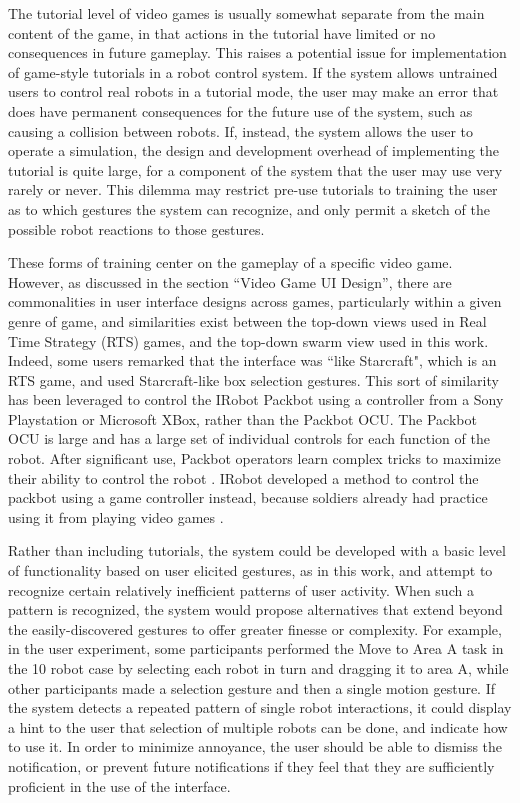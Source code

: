 The tutorial level of video games is usually somewhat separate from the main content of the game, in that actions in the tutorial have limited or no consequences in future gameplay. 
This raises a potential issue for implementation of game-style tutorials in a robot control system. 
If the system allows untrained users to control real robots in a tutorial mode, the user may make an error that does have permanent consequences for the future use of the system, such as causing a collision between robots. 
If, instead, the system allows the user to operate a simulation, the design and development overhead of implementing the tutorial is quite large, for a component of the system that the user may use very rarely or never. 
This dilemma may restrict pre-use tutorials to training the user as to which gestures the system can recognize, and only permit a sketch of the possible robot reactions to those gestures. 

These forms of training center on the gameplay of a specific video game. 
However, as discussed in the section ``Video Game UI Design'', there are commonalities in user interface designs across games, particularly within a given genre of game, and similarities exist between the top-down views used in Real Time Strategy (RTS) games, and the top-down swarm view used in this work. 
Indeed, some users remarked that the interface was ``like Starcraft", which is an RTS game, and used Starcraft-like box selection gestures. 
This sort of similarity has been leveraged to control the IRobot Packbot using a controller from a Sony Playstation or Microsoft XBox, rather than the Packbot OCU. 
The Packbot OCU is large and has a large set of individual controls for each function of the robot. 
After significant use, Packbot operators learn complex tricks to maximize their ability to control the robot \citep{micire2011design}.
IRobot developed a method to control the packbot using a game controller instead, because soldiers already had practice using it from playing video games \citep{glaser2010impact}. 

Rather than including tutorials, the system could be developed with a basic level of functionality based on user elicited gestures, as in this work, and attempt to recognize certain relatively inefficient patterns of user activity. 
When such a pattern is recognized, the system would propose alternatives that extend beyond the easily-discovered gestures to offer greater finesse or complexity. 
For example, in the user experiment, some participants performed the Move to Area A task in the 10 robot case by selecting each robot in turn and dragging it to area A, while other participants made a selection gesture and then a single motion gesture. 
If the system detects a repeated pattern of single robot interactions, it could display a hint to the user that selection of multiple robots can be done, and indicate how to use it. 
In order to minimize annoyance, the user should be able to dismiss the notification, or prevent future notifications if they feel that they are sufficiently proficient in the use of the interface. 

